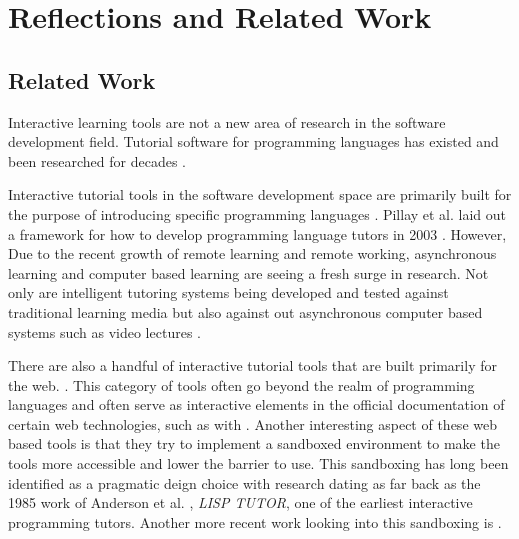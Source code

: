 \chapter{Reflections and Related Work}
\label{chap:reflection}
\section{Related Work}

Interactive learning tools are not a new area of research in the software
development field. Tutorial software for programming languages has existed  and
been researched for decades \cite{anderson1985lisp,
	anderson1986automatedtutoring, gerdes2012interactive,
	permpool2019interactive, lee2005intelligent, jeuring2011programming,
	holland2009j,  schez2020intelligent}.

Interactive tutorial tools in the software development space are primarily
built for the purpose of introducing specific programming languages
\cite{donehaskell, holland2009j, ajayi2010development, lee2005intelligent}.
Pillay et al. laid out a framework for how to develop programming language
tutors in 2003 \cite{pillay2003developing}. However, Due to the recent growth
of remote learning and remote working, asynchronous learning and computer based
learning are seeing a fresh surge in research. Not only are intelligent
tutoring systems being developed and tested against traditional learning media
but also against out asynchronous computer based systems such as video lectures
\cite{becker201950, ossovski2022comparing}.

There are also a handful of interactive tutorial tools that are built primarily
for the web. \cite{donehaskell, harris_team, harris_team, herweijer,
lee2005intelligent}. This category of tools often go beyond the realm of
programming languages and often serve as interactive elements in the official
documentation of certain web technologies, such as with
\cite{harris_team,team_meta}. Another interesting aspect of these web based
tools is that they try to implement a sandboxed environment to make the tools
more accessible and lower the barrier to use. This sandboxing has long been
identified as a pragmatic deign choice with research dating as far back as the
1985 work of Anderson et al. \cite{anderson1985lisp}, \textit{LISP TUTOR}, one
of the earliest interactive programming tutors. Another more recent work
looking into this sandboxing is \cite{permpool2019interactive}.

